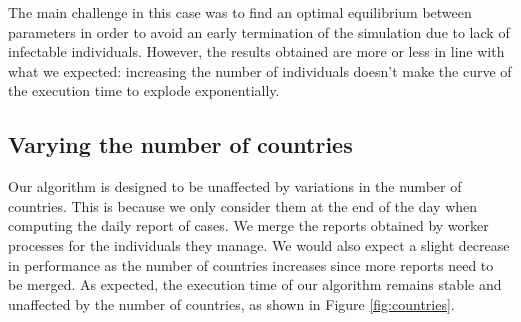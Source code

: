 \documentclass[11pt]{article}
\begin{document}
The main challenge in this case was to find an optimal equilibrium between parameters in order to avoid an early termination of the simulation due to lack of infectable individuals.
However, the results obtained are more or less in line with what we expected: increasing the number of individuals doesn't make the curve of the execution time to explode exponentially.

\subsection{Varying the number of countries}
\label{subsec:countries}
Our algorithm is designed to be unaffected by variations in the number of countries. This is because we only consider them at the end of the day when computing the daily report of cases. We merge the reports obtained by worker processes for the individuals they manage. We would also expect a slight decrease in performance as the number of countries increases since more reports need to be merged. As expected, the execution time of our algorithm remains stable and unaffected by the number of countries, as shown in Figure \ref{fig:countries}.
\end{document}
